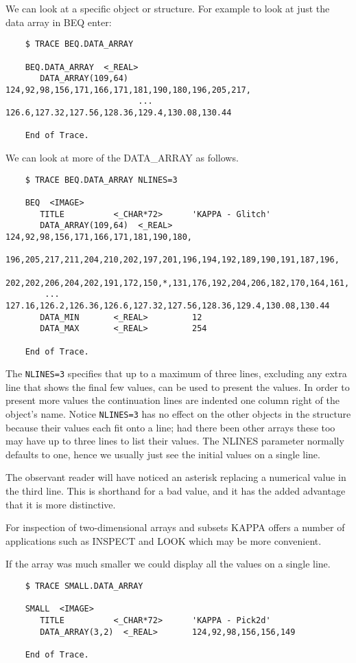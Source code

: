 We can look at a specific object or structure.  For example to look
at just the data array in BEQ enter:
\small
\begin{verbatim}
    $ TRACE BEQ.DATA_ARRAY
   
    BEQ.DATA_ARRAY  <_REAL>
       DATA_ARRAY(109,64)  124,92,98,156,171,166,171,181,190,180,196,205,217,
                           ... 126.6,127.32,127.56,128.36,129.4,130.08,130.44
                                                                              
    End of Trace.
\end{verbatim}
\normalsize
We can look at more of the DATA\_ARRAY as follows.
\small
\begin{verbatim}
    $ TRACE BEQ.DATA_ARRAY NLINES=3
   
    BEQ  <IMAGE>
       TITLE          <_CHAR*72>      'KAPPA - Glitch'
       DATA_ARRAY(109,64)  <_REAL>    124,92,98,156,171,166,171,181,190,180,
        196,205,217,211,204,210,202,197,201,196,194,192,189,190,191,187,196,
        202,202,206,204,202,191,172,150,*,131,176,192,204,206,182,170,164,161,
        ... 127.16,126.2,126.36,126.6,127.32,127.56,128.36,129.4,130.08,130.44
       DATA_MIN       <_REAL>         12
       DATA_MAX       <_REAL>         254
 
    End of Trace.
\end{verbatim}
\normalsize
The {\tt NLINES=3} specifies that up to a maximum of three lines, 
excluding any extra line that shows the final few values, can be
used to present the values.  In order to present more values the 
continuation lines are indented one column right of the object's name.
Notice {\tt NLINES=3} has no effect on the other objects in the 
structure because their values each fit onto a line; had there been
other arrays these too may have up to three lines to list their
values.  The NLINES parameter normally defaults to one, hence we usually
just see the initial values on a single line.

The observant reader will have noticed an asterisk replacing a numerical
value in the third line.  This is shorthand for a bad value, and it
has the added advantage that it is more distinctive.

For inspection of two-dimensional arrays and subsets {\small KAPPA}
offers a number of applications such as INSPECT and LOOK which may be
more convenient. 

If the array was much smaller we could display all the values on a single 
line.
\small
\begin{verbatim}
    $ TRACE SMALL.DATA_ARRAY
   
    SMALL  <IMAGE>
       TITLE          <_CHAR*72>      'KAPPA - Pick2d'
       DATA_ARRAY(3,2)  <_REAL>       124,92,98,156,156,149
 
    End of Trace.
\end{verbatim}
\normalsize

